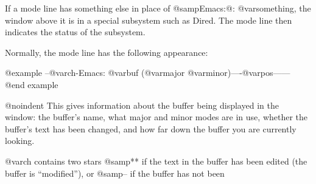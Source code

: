   If a mode line has something else in place of @samp{Emacs:@:
@var{something}}, the window above it is in a special subsystem
such as Dired.  The mode line then indicates the status of the
subsystem.

  Normally, the mode line has the following appearance:

@example
--@var{ch}-Emacs: @var{buf}      (@var{major} @var{minor})----@var{pos}------
@end example

@noindent
This gives information about the buffer being displayed in the window: the
buffer's name, what major and minor modes are in use, whether the buffer's
text has been changed, and how far down the buffer you are currently
looking.

  @var{ch} contains two stars @samp{**} if the text in the buffer has been
edited (the buffer is ``modified''), or @samp{--} if the buffer has not been
